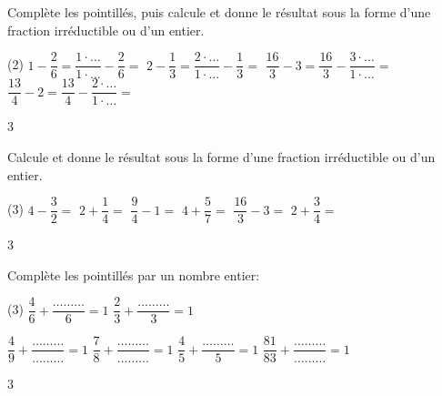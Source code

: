\documentclass[a4paper,11pt]{report}
\begin{document}
\vfill

\begin{exo}
{Complète les pointillés, puis calcule et donne le résultat sous la forme d'une fraction irréductible ou d'un entier. 
\begin{tasks}(2)
\medskip\task $1-\dfrac{2}{6}= \dfrac{1\cdot\ldots}{1\cdot\ldots}- \dfrac{2}{6}=$ 
\medskip \task $2-\dfrac{1}{3}=\dfrac{2\cdot\ldots}{1\cdot\ldots}- \dfrac{1}{3}=$ 
\medskip \task $\dfrac{16}{3}-3= \dfrac{16}{3}-\dfrac{3\cdot\ldots}{1\cdot\ldots}=$ 
\medskip \task $\dfrac{13}{4}-2=\dfrac{13}{4}-\dfrac{2\cdot\ldots}{1\cdot\ldots}=$
\end{tasks}
}{3}
\end{exo}

\vfill

\newpage
\begin{exo}
{Calcule et donne le résultat sous la forme d'une fraction irréductible ou d'un entier. 
\begin{tasks}(3)
\task $4-\dfrac{3}{2}= $ 
 \task $2+\dfrac{1}{4}=$ 
 \task $\dfrac{9}{4}-1=$
 \task $4+\dfrac{5}{7}=$
 \task $\dfrac{16}{3}-3=$
 \task $2+\dfrac{3}{4}=$ 
\end{tasks}
}{3}
\end{exo}

\begin{exop}
{Complète les pointillés  par un nombre entier:	
\begin{tasks}(3)
\task $\dfrac{4}{6}+\dfrac{\ldots\ldots\ldots}{6}=1$
\task $\dfrac{2}{3}+\dfrac{\ldots\ldots\ldots}{3}=1$

\task $\dfrac{4}{9}+\dfrac{\ldots\ldots\ldots}{\ldots\ldots\ldots}=1$
\task $\dfrac{7}{8}+\dfrac{\ldots\ldots\ldots}{\ldots\ldots\ldots}=1$
\task $\dfrac{4}{5}+\dfrac{\ldots\ldots\ldots}{5}=1$
\task $\dfrac{81}{83}+\dfrac{\ldots\ldots\ldots}{\ldots\ldots\ldots}=1$
\end{tasks}
}{3}
\end{exop}
\end{document}
